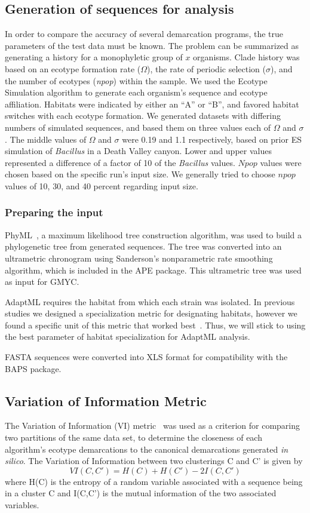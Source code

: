 \subsection*{Generation of sequences for analysis}
In order to compare the accuracy of several demarcation programs, the true parameters of the test data must be known.
The problem can be summarized as generating a history for a monophyletic group of $x$ organisms.
Clade history was based on an ecotype formation rate ($\Omega$), the rate of periodic selection ($\sigma$), and the number of ecotypes (\emph{npop}) within the sample.
We used the Ecotype Simulation algorithm to generate each organism's sequence and ecotype affiliation.
Habitats were indicated by either an ``A'' or ``B'', and favored habitat switches with each ecotype formation.
We generated datasets with differing numbers of simulated sequences, and based them on three values each of $\Omega$ and $\sigma$.
The middle values of $\Omega$ and $\sigma$ were 0.19 and 1.1 respectively, based on prior ES simulation of \emph{Bacillus} in a Death Valley canyon.
Lower and upper values represented a difference of a factor of 10 of the \emph{Bacillus} values.
$Npop$ values were chosen based on the specific run's input size.
We generally tried to choose $npop$ values of 10, 30, and 40 percent regarding input size.

\subsubsection*{Preparing the input}
PhyML~\cite{guindon2010new}, a maximum likelihood tree construction algorithm, was used to build a phylogenetic tree from generated sequences.
The tree was converted into an ultrametric chronogram using Sanderson's nonparametric rate smoothing algorithm, which is included in the APE package.
This ultrametric tree was used as input for GMYC.

AdaptML requires the habitat from which each strain was isolated.
In previous studies we designed a specialization metric for designating habitats, however we found a specific unit of this metric that worked best~\cite{carlo}.
Thus, we will stick to using the best parameter of habitat specialization for AdaptML analysis.

FASTA sequences were converted into XLS format for compatibility with the BAPS package.

\subsection*{Variation of Information Metric}
The Variation of Information (VI) metric~\cite{meilua2003comparing} was used as a criterion for comparing two partitions of the same data set, to determine the closeness of each algorithm's ecotype demarcations to the canonical demarcations generated \emph{in silico}.
The Variation of Information between two clusterings C and C' is given by$$VI(C, C') = H(C) + H(C') - 2I(C, C')$$where H(C) is the entropy of a random variable associated with a sequence being in a cluster C and I(C,C') is the mutual information of the two associated variables.

